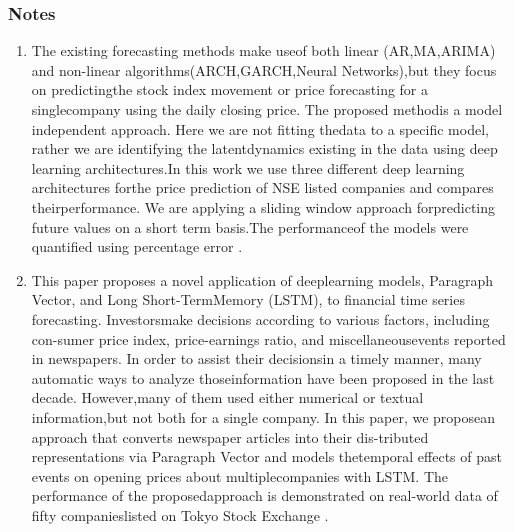 \documentclass[12pt,journal,compsoc]{IEEEtran}
\begin{document}
\subsubsection{Notes}
\begin{enumerate}
	\item The   existing   forecasting   methods   make   useof   both   linear   (AR,MA,ARIMA)   and   non-linear  algorithms(ARCH,GARCH,Neural Networks),but they focus on predictingthe  stock  index  movement  or  price  forecasting  for  a singlecompany  using  the  daily  closing  price.  The  proposed  methodis  a  model  independent  approach.  Here  we  are  not  fitting  thedata  to  a  specific  model,  rather  we  are  identifying  the  latentdynamics existing in the data using deep learning architectures.In this work we use three different deep learning architectures forthe price prediction of NSE listed companies and compares theirperformance.  We  are  applying  a  sliding  window  approach  forpredicting future values on a short term basis.The performanceof the models were quantified using percentage error \cite{selvin2017stock}.
	
	\item This paper proposes a novel application of deeplearning models, Paragraph Vector, and Long Short-TermMemory (LSTM), to financial time series forecasting. Investorsmake decisions according to various factors, including con-sumer price index, price-earnings ratio, and miscellaneousevents reported in newspapers. In order to assist their decisionsin a timely manner, many automatic ways to analyze thoseinformation have been proposed in the last decade. However,many of them used either numerical or textual information,but not both for a single company. In this paper, we proposean approach that converts newspaper articles into their dis-tributed representations via Paragraph Vector and models thetemporal effects of past events on opening prices about multiplecompanies with LSTM. The performance of the proposedapproach is demonstrated on real-world data of fifty companieslisted on Tokyo Stock Exchange \cite{akita2016deep}.
	

\end{enumerate}
\end{document}
